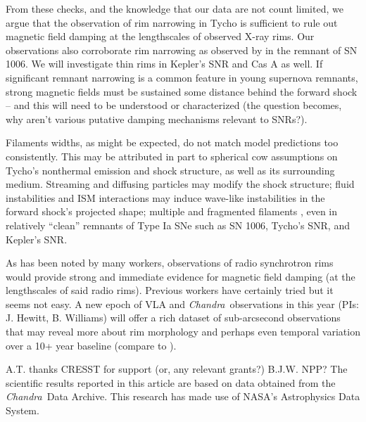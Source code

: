 \documentclass[iop, apj, numberedappendix]{emulateapj}
\newcommand*{\Chandra}{\textit{Chandra}\ }
\begin{document}
From these checks, and the knowledge that our data are not count limited, we
argue that the observation of rim narrowing in Tycho is sufficient to
rule out magnetic field damping at the lengthscales of observed X-ray rims.
Our observations also corroborate rim narrowing as observed by
\citet{ressler2014} in the remnant of SN 1006.  We will investigate thin rims
in Kepler's SNR and Cas A \citep[but cf.][]{araya2010} as well.  If significant
remnant narrowing is a common feature in young supernova remnants, strong
magnetic fields must be sustained some distance behind the forward shock -- and
this will need to be understood or characterized (the question becomes, why
aren't various putative damping mechanisms relevant to SNRs?).

Filaments widths, as might be expected, do not match model predictions too
consistently.  This may be attributed in part to spherical cow assumptions on
Tycho's nonthermal emission and shock structure, as well as its surrounding
medium.  Streaming and diffusing particles may modify the shock structure;
fluid instabilities and ISM interactions may induce wave-like instabilities in
the forward shock's projected shape; multiple and fragmented filaments
\citep{caprioli2013},
even in relatively ``clean'' remnants of Type Ia SNe such as SN 1006, Tycho's
SNR, and Kepler's SNR. 

As has been noted by many workers, observations of radio synchrotron rims would
provide strong and immediate evidence for magnetic field damping (at the
lengthscales of said radio rims).  Previous workers have certainly tried
\citep{cassam-chenai2007, morlino2012} but it seems not easy.
A new epoch of VLA and \Chandra observations in this year (PIs: J. Hewitt, B.
Williams) will offer a rich dataset of sub-arcsecond observations that may
reveal more about rim morphology and perhaps even temporal variation over a 10+
year baseline (compare to \citet{katsuda2010-sn1006}).

\acknowledgments

A.T. thanks CRESST for support (or, any relevant grants?)
B.J.W. NPP?
The scientific results reported in this article are based on data obtained from
the \Chandra Data Archive.
This research has made use of NASA's Astrophysics Data System.
\end{document}
